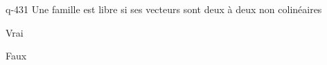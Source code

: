 \begin{truefalse}{q-431}
Une famille est libre si ses vecteurs sont deux à deux non colinéaires 
\item Vrai
\item* Faux
\end{truefalse}

